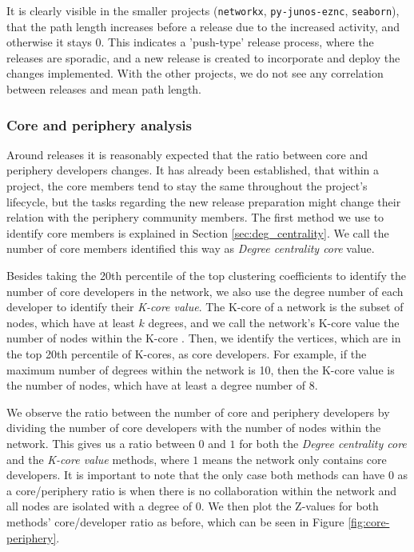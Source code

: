 It is clearly visible in the smaller projects (\texttt{networkx}, \texttt{py-junos-eznc}, \texttt{seaborn}), that the path length increases before a release due to the increased activity, and otherwise it stays $0$. This indicates a 'push-type' release process, where the releases are sporadic, and a new release is created to incorporate and deploy the changes implemented. With the other projects, we do not see any correlation between releases and mean path length.

\subsubsection{Core and periphery analysis}

Around releases it is reasonably expected that the ratio between core and periphery developers changes. It has already been established, that within a project, the core members tend to stay the same throughout the project's lifecycle, but the tasks regarding the new release preparation might change their relation with the periphery community members. The first method we use to identify core members is explained in Section \ref{sec:deg_centrality}. We call the number of core members identified this way as \textit{Degree centrality core} value. 

Besides taking the 20th percentile of the top clustering coefficients to identify the number of core developers in the network, we also use the degree number of each developer to identify their \textit{K-core value}. The K-core of a network is the subset of nodes, which have at least $k$ degrees, and we call the network's K-core value the number of nodes within the K-core \cite{batageljAlgorithmCoresDecomposition2003}. Then, we identify the vertices, which are in the top 20th percentile of K-cores, as core developers. For example, if the maximum number of degrees within the network is 10, then the K-core value is the number of nodes, which have at least a degree number of 8.

We observe the ratio between the number of core and periphery developers by dividing the number of core developers with the number of nodes within the network. This gives us a ratio between $0$ and $1$ for both the \textit{Degree centrality core} and the \textit{K-core value} methods, where $1$ means the network only contains core developers. It is important to note that the only case both methods can have $0$ as a core/periphery ratio is when there is no collaboration within the network and all nodes are isolated with a degree of $0$. We then plot the Z-values for both methods' core/developer ratio as before, which can be seen in Figure \ref{fig:core-periphery}.

